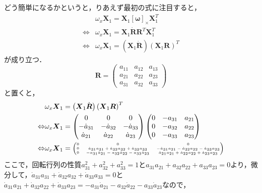 どう簡単になるかというと，りあえず最初の式に注目すると，
\begin{align}
  & \omega_{x} \boldsymbol{X}_1 = \boldsymbol{X}_1 [\boldsymbol{\omega}]_{\times} \boldsymbol{X}_1^{T}\\
  \Leftrightarrow & \omega_{x} \boldsymbol{X}_1 = \boldsymbol{X}_1 \dot{\boldsymbol{R}} \boldsymbol{R}^{T} \boldsymbol{X}_1^{T}\\
  \Leftrightarrow & \omega_{x} \boldsymbol{X}_1 = \left(\boldsymbol{X}_1 \dot{\boldsymbol{R}}\right) \left(\boldsymbol{X}_1 \boldsymbol{R}\right)^{T}
\end{align}
が成り立つ．
\begin{equation}
  \boldsymbol{R} = \begin{pmatrix}
      a_{11} & a_{12} & a_{13}\\
      a_{21} & a_{22} & a_{23}\\
      a_{31} & a_{32} & a_{33}
  \end{pmatrix}
\end{equation}
と置くと，
\begin{align}
  & \omega_{x} \boldsymbol{X}_1 = \left(\boldsymbol{X}_1 \dot{\boldsymbol{R}}\right) \left(\boldsymbol{X}_1 \boldsymbol{R}\right)^{T}\\
  \Leftrightarrow & \omega_{x} \boldsymbol{X}_1 =
  \begin{pmatrix}
    0 & 0 & 0\\
    - \dot{a}_{31} & - \dot{a}_{32} & - \dot{a}_{33}\\
    \dot{a}_{21} & \dot{a}_{22} & \dot{a}_{23}
  \end{pmatrix}
  \begin{pmatrix}
    0 & - a_{31} & a_{21}\\
    0 & - a_{32} & a_{22}\\
    0 & - a_{33} & a_{23}
  \end{pmatrix}\\
  \Leftrightarrow & \omega_{x} \boldsymbol{X}_1 =
  {\tiny \begin{pmatrix}
      0 & 0 & 0\\
      0 & \dot{a}_{31} a_{31} + \dot{a}_{32} a_{32} + \dot{a}_{33} a_{33} & - \dot{a}_{31} a_{21} - \dot{a}_{32} a_{22} - \dot{a}_{33} a_{23}\\
      0 & - a_{31} \dot{a}_{21} - a_{32} \dot{a}_{22} - a_{33} \dot{a}_{23} & \dot{a}_{21} a_{21} + \dot{a}_{22} a_{22} + \dot{a}_{23} a_{23}
  \end{pmatrix}}
\end{align}
ここで，回転行列の性質$a_{31}^2 + a_{32}^2 + a_{33}^2=1$と$a_{31} a_{21} + a_{32} a_{22} + a_{33} a_{23} = 0$より，微分して，$\dot{a}_{31} a_{31} + \dot{a}_{32} a_{32} + \dot{a}_{33} a_{33} = 0$と$\dot{a}_{31} a_{21} + \dot{a}_{32} a_{22} + \dot{a}_{33} a_{23} = - a_{31} \dot{a}_{21} - a_{32} \dot{a}_{22} - a_{33} \dot{a}_{23}$なので，
